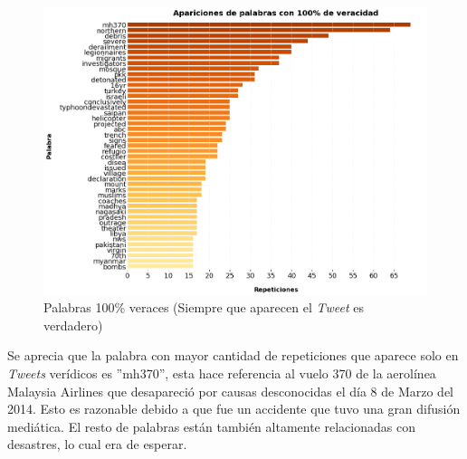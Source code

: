 \documentclass[titlepage,a4paper]{article}
\begin{document}
 
    \begin{figure}[H]
    \centering
    \includegraphics[width=1\textwidth]{graficos/Analisis Lexico Grafico/aparaciones_de_palabras_con_100_de_veracidad.png}
    \caption{Palabras 100\% veraces (Siempre que aparecen el \textit{Tweet} es verdadero)}
    \end{figure}
    
    Se aprecia que la palabra con mayor cantidad de repeticiones que aparece solo en \textit{Tweets} verídicos es ''mh370'', esta hace referencia al vuelo 370 de la aerolínea Malaysia Airlines que desapareció por causas desconocidas el día 8 de Marzo del 2014. Esto es razonable debido a que fue un accidente que tuvo una gran difusión mediática. El resto de palabras están también altamente relacionadas con desastres, lo cual era de esperar. 
    
\end{document}
